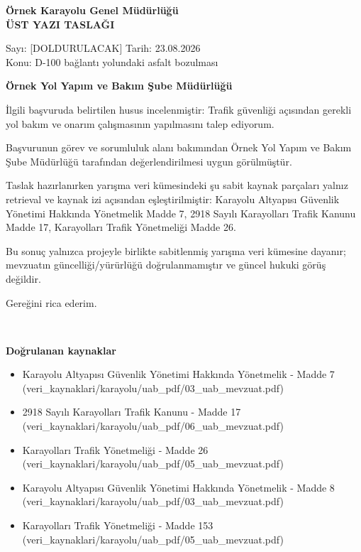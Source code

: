 \documentclass[11pt,a4paper]{article}
\begin{document}
\begin{center}
{\bfseries Örnek Karayolu Genel Müdürlüğü\\}
{\bfseries ÜST YAZI TASLAĞI}
\end{center}
\noindent Sayı: [DOLDURULACAK] \hfill Tarih: 23.08.2026\\
\noindent Konu: D-100 bağlantı yolundaki asfalt bozulması
\vspace{8mm}
\begin{center}\bfseries Örnek Yol Yapım ve Bakım Şube Müdürlüğü\end{center}
İlgili başvuruda belirtilen husus incelenmiştir: Trafik güvenliği açısından gerekli yol bakım ve onarım çalışmasının yapılmasını talep ediyorum.\par

Başvurunun görev ve sorumluluk alanı bakımından Örnek Yol Yapım ve Bakım Şube Müdürlüğü tarafından değerlendirilmesi uygun görülmüştür.\par

Taslak hazırlanırken yarışma veri kümesindeki şu sabit kaynak parçaları yalnız retrieval ve kaynak izi açısından eşleştirilmiştir: Karayolu Altyapısı Güvenlik Yönetimi Hakkında Yönetmelik Madde 7, 2918 Sayılı Karayolları Trafik Kanunu Madde 17, Karayolları Trafik Yönetmeliği Madde 26.\par

Bu sonuç yalnızca projeyle birlikte sabitlenmiş yarışma veri kümesine dayanır; mevzuatın güncelliği/yürürlüğü doğrulanmamıştır ve güncel hukuki görüş değildir.\par

Gereğini rica ederim.\par
\vspace{10mm}
\begin{flushright}
[DOLDURULACAK]\\
[DOLDURULACAK]
\end{flushright}
\vfill
\noindent\textbf{Doğrulanan kaynaklar}
\begin{itemize}[leftmargin=*]
\item Karayolu Altyapısı Güvenlik Yönetimi Hakkında Yönetmelik - Madde 7 (veri\_kaynaklari/karayolu/uab\_pdf/03\_uab\_mevzuat.pdf)
\item 2918 Sayılı Karayolları Trafik Kanunu - Madde 17 (veri\_kaynaklari/karayolu/uab\_pdf/06\_uab\_mevzuat.pdf)
\item Karayolları Trafik Yönetmeliği - Madde 26 (veri\_kaynaklari/karayolu/uab\_pdf/05\_uab\_mevzuat.pdf)
\item Karayolu Altyapısı Güvenlik Yönetimi Hakkında Yönetmelik - Madde 8 (veri\_kaynaklari/karayolu/uab\_pdf/03\_uab\_mevzuat.pdf)
\item Karayolları Trafik Yönetmeliği - Madde 153 (veri\_kaynaklari/karayolu/uab\_pdf/05\_uab\_mevzuat.pdf)
\end{itemize}
\end{document}
